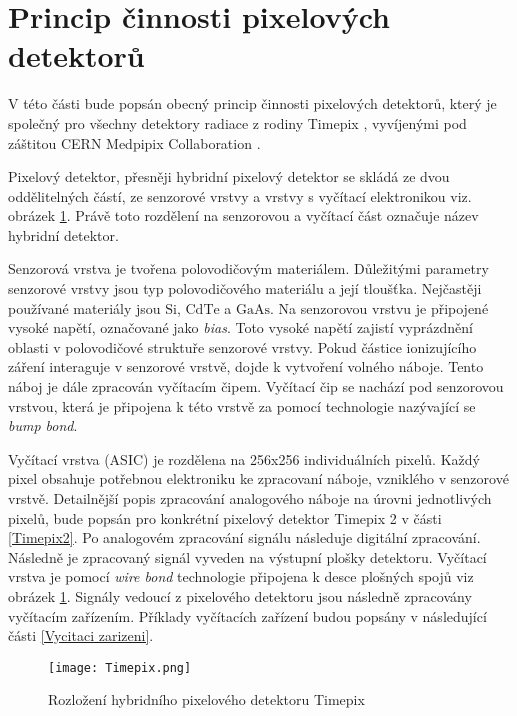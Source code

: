 \section{Princip činnosti pixelových detektorů}
\label{kap:2.1}
V této části bude popsán obecný princip činnosti pixelových detektorů, který je společný pro všechny detektory radiace z rodiny Timepix \cite{Llopart}, vyvíjenými pod záštitou CERN Medpipix Collaboration \cite{Medpix}. 
\par Pixelový detektor, přesněji hybridní pixelový detektor se skládá ze dvou oddělitelných částí, ze senzorové vrstvy a vrstvy s vyčítací elektronikou viz. obrázek \ref{fig:Timepix}. Právě toto rozdělení na senzorovou a vyčítací část označuje název hybridní detektor.
\par Senzorová vrstva je tvořena polovodičovým materiálem. Důležitými parametry senzorové vrstvy jsou typ polovodičového materiálu a její tloušťka. Nejčastěji používané materiály jsou $\text{Si}$, $\text{CdTe}$ a $\text{GaAs}$. Na senzorovou vrstvu je připojené vysoké napětí, označované jako \textit{bias}. Toto vysoké napětí zajistí vyprázdnění oblasti v polovodičové struktuře senzorové vrstvy. Pokud částice ionizujícího záření interaguje v senzorové vrstvě, dojde k vytvoření volného náboje. Tento náboj je dále zpracován vyčítacím čipem. Vyčítací čip se nachází pod senzorovou vrstvou, která je připojena k této vrstvě za pomocí technologie nazývající se \textit{bump bond}.
\par Vyčítací vrstva (ASIC) je rozdělena na 256x256 individuálních pixelů. Každý pixel obsahuje potřebnou elektroniku ke zpracovaní náboje, vzniklého v senzorové vrstvě. Detailnější popis zpracování analogového náboje na úrovni jednotlivých pixelů, bude popsán pro konkrétní pixelový detektor Timepix 2 v části \ref{Timepix2}. Po analogovém zpracování signálu následuje digitální zpracování. Následně je zpracovaný signál vyveden na výstupní plošky detektoru. Vyčítací vrstva je pomocí \textit{wire bond} technologie připojena k desce plošných spojů viz obrázek \ref{fig:Timepix}. Signály vedoucí z pixelového detektoru jsou následně zpracovány vyčítacím zařízením. Příklady vyčítacích zařízení budou popsány v následující části \ref{Vycitaci zarizeni}.
 \begin{figure}[h!]
 	\centering
 	\captionsetup{justification=centering}
 	\texttt{[image: Timepix.png]}
 	\caption{Rozložení hybridního pixelového detektoru Timepix \cite{Platkevic}} 
 	\label{fig:Timepix}
 \end{figure}	

